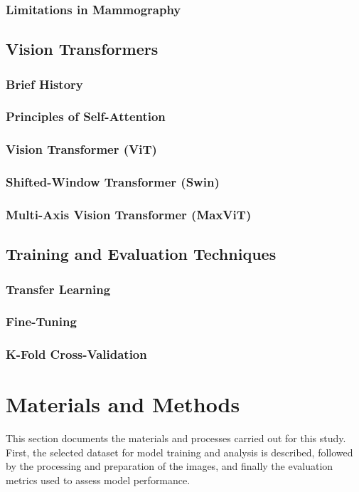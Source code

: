 \documentclass[a4paper,10pt]{book}
\begin{document}
\subsection{Limitations in Mammography}

\section{Vision Transformers}
\subsection{Brief History}
\subsection{Principles of Self-Attention}
\subsection{Vision Transformer (ViT)}
\subsection{Shifted-Window Transformer (Swin)}
\subsection{Multi-Axis Vision Transformer (MaxViT)}

\section{Training and Evaluation Techniques}
\subsection{Transfer Learning}
\subsection{Fine-Tuning}
\subsection{K-Fold Cross-Validation}
\chapter{Materials and Methods}

This section documents the materials and processes carried out for this study. First, the selected dataset for model training and analysis is described, followed by the processing and preparation of the images, and finally the evaluation metrics used to assess model performance.
\end{document}
